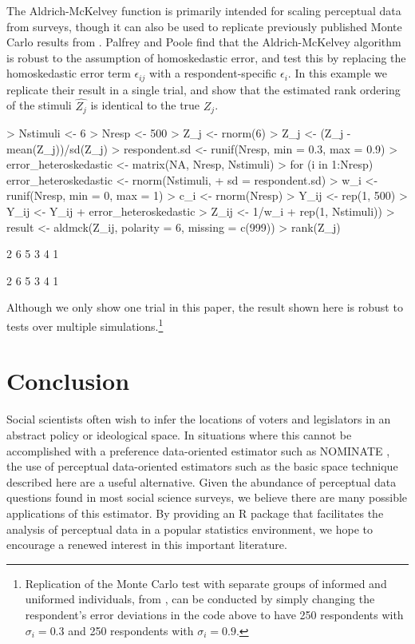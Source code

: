 \documentclass[nojss]{jss}
\begin{document}
The Aldrich-McKelvey function is primarily intended for scaling perceptual data from surveys, though it can also be used to replicate previously published Monte Carlo results from \citet{palfrey1987relationship}. Palfrey and Poole find that the Aldrich-McKelvey algorithm is robust to the assumption of homoskedastic error, and test this by replacing the homoskedastic error term $\epsilon_{ij}$ with a respondent-specific $\epsilon_{i}$. In this example we replicate their result in a single trial, and show that the estimated rank ordering of the stimuli $\hat{Z_j}$ is identical to the true $Z_j$.

\begin{Schunk}
\begin{Sinput}
> Nstimuli <- 6
> Nresp <- 500
> Z_j <- rnorm(6)
> Z_j <- (Z_j - mean(Z_j))/sd(Z_j)
> respondent.sd <- runif(Nresp, min = 0.3, max = 0.9)
> error_heteroskedastic <- matrix(NA, Nresp, Nstimuli)
> for (i in 1:Nresp) error_heteroskedastic <- rnorm(Nstimuli, 
+     sd = respondent.sd)
> w_i <- runif(Nresp, min = 0, max = 1)
> c_i <- rnorm(Nresp)
> Y_ij <- rep(1, 500) %
> Y_ij <- Y_ij + error_heteroskedastic
> Z_ij <- 1/w_i %
+     rep(1, Nstimuli))
> result <- aldmck(Z_ij, polarity = 6, missing = c(999))
> rank(Z_j)
\end{Sinput}
\begin{Soutput}
[1] 2 6 5 3 4 1
\end{Soutput}
\begin{Soutput}
2 6 5 3 4 1 
\end{Soutput}
\end{Schunk}

Although we only show one trial in this paper, the result shown here is robust to tests over multiple simulations.\footnote{Replication of the Monte Carlo test with separate groups of informed and uniformed individuals, from \citet[pg. 515]{palfrey1987relationship}, can be conducted by simply changing the respondent's error deviations in the code above to have 250 respondents with $\sigma_i=0.3$ and 250 respondents with $\sigma_i=0.9$.}

\section{Conclusion}

Social scientists often wish to infer the locations of voters and legislators in an abstract policy or ideological space.  In situations where this cannot be accomplished with a preference data-oriented estimator such as NOMINATE \citep{Congress}, the use of perceptual data-oriented estimators such as the basic space technique described here are a useful alternative. Given the abundance of perceptual data questions found in most social science surveys, we believe there are many possible applications of this estimator. By providing an R \citep{R} package that facilitates the analysis of perceptual data in a popular statistics environment, we hope to encourage a renewed interest in this important literature.
\end{document}
